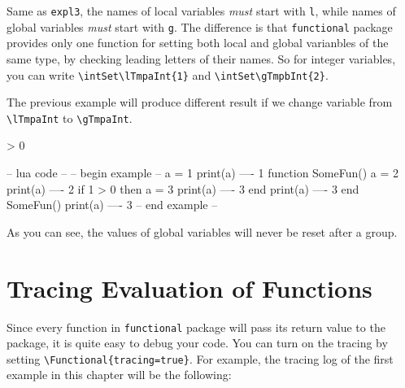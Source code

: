 \documentclass[oneside]{book}
\begin{document}
Same as \verb!expl3!, the names of local variables \emph{must} start with \verb!l!,
while names of global variables \emph{must} start with \verb!g!.
The difference is that \verb!functional! package provides only one function for setting
both local and global varianbles of the same type,
by checking leading letters of their names. So for integer variables, you can write
\verb!\intSet\lTmpaInt{1}! and \verb!\intSet\gTmpbInt{2}!.

The previous example will produce different result
if we change variable from \verb!\lTmpaInt! to \verb!\gTmpaInt!.

\begin{minipage}{0.58\textwidth}
\begin{codehigh}
\IgnoreSpacesOn
\intSet {}
\intVarLog \gTmpaInt            %
\prgNewFunction \someFun { } {
  \intSet {}
  \intVarLog \gTmpaInt          %
   > {0} {
    \intSet {}
    \intVarLog \gTmpaInt        %
  }{ }
  \intVarLog \gTmpaInt          %
}
\someFun
\intVarLog \gTmpaInt            %
\IgnoreSpacesOff
\end{codehigh}
\end{minipage}%
\begin{minipage}{0.42\textwidth}
\begin{code}
-- lua code --
-- begin example --
a = 1
print(a)            ---- 1
function SomeFun()
  a = 2
  print(a)          ---- 2
  if 1 > 0 then
    a = 3
    print(a)        ---- 3
  end
  print(a)          ---- 3
end
SomeFun()
print(a)            ---- 3
-- end example --
\end{code}
\end{minipage}

As you can see, the values of global variables will never be reset after a group.

\section{Tracing Evaluation of Functions}

Since every function in \verb!functional! package will pass its return value to
the package, it is quite easy to debug your code.
You can turn on the tracing by setting \verb!\Functional{tracing=true}!.
For example, the tracing log of the first example in this chapter will be the following:
\end{document}

